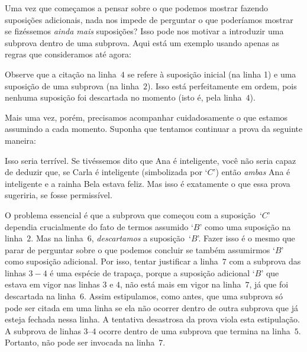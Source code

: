 Uma vez que começamos a pensar sobre o que podemos mostrar fazendo suposições adicionais, nada nos impede de perguntar  o que poderíamos mostrar se fizéssemos  \emph{ainda mais}  suposições?  Isso pode nos motivar a introduzir uma subprova dentro de uma subprova.  Aqui está um exemplo usando apenas as regras que consideramos até agora:


\begin{fitchproof}
\open
	\open
	\close
\close
{}
\end{fitchproof}
 Observe que a citação na linha~$4$ se refere à suposição inicial (na linha 1) e uma suposição de uma subprova (na linha~$2$). Isso está perfeitamente em ordem, pois nenhuma suposição foi descartada no momento (isto é, pela linha~$4$).  

Mais uma vez, porém, precisamos acompanhar cuidadosamente o que estamos assumindo a cada momento. Suponha que tentamos continuar a prova da seguinte maneira:
\begin{fitchproof}
\open
	\open
	\close
\close
{}
 
\end{fitchproof}
 Isso seria terrível. Se tivéssemos dito  que Ana é inteligente, você não seria capaz de deduzir que, se Carla é inteligente (simbolizada por  `$C$') então \emph{ambas} Ana é inteligente  e a rainha Bela estava feliz. Mas isso é exatamente o que essa prova sugeriria, se fosse permissível.

O problema essencial é que a subprova que começou com a suposição~`$C$' dependia crucialmente do fato de termos assumido `$B$' como uma suposição na linha~$2$.  Mas na linha~$6$, \emph{descartamos} a suposição~`$B$'. Fazer isso é o mesmo que parar de perguntar sobre o que podemos concluir se também assumirmos `$B$’ como suposição adicional. Por isso, tentar justificar a linha~$7$ com a subprova das linhas $3-4$ é uma espécie de trapaça, porque a suposição adicional `$B$' que estava em vigor nas linhas $3$ e $4$, não está mais em vigor na linha~$7$, já que foi descartada na linha~$6$. Assim estipulamos, como antes, que uma subprova só pode ser citada em uma linha se ela não ocorrer dentro de outra subprova que já esteja fechada nessa linha. A tentativa desastrosa da prova viola esta estipulação.  A subprova de linhas $3$--$4$ ocorre dentro de uma subprova que termina na linha~$5$. Portanto, não pode ser invocada na linha~$7$.


